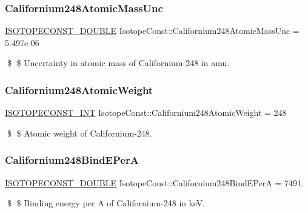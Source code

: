 \subsubsection{\texorpdfstring{Californium248\+Atomic\+Mass\+Unc}{Californium248AtomicMassUnc}}
{\footnotesize\ttfamily \mbox{\hyperlink{group___isotope_const-_macros_ga8f45a7272ce02c0b4c65c44636ed719a}{I\+S\+O\+T\+O\+P\+E\+C\+O\+N\+S\+T\+\_\+\+D\+O\+U\+B\+LE}} Isotope\+Const\+::\+Californium248\+Atomic\+Mass\+Unc = 5.\+497e-\/06}

\$ \$ Uncertainty in atomic mass of Californium-\/248 in amu. \mbox{\label{group___isotope_const-_californium-_cf248_ga7088e1f286e7d652cea5d9141ddc1b3b}} 
\subsubsection{\texorpdfstring{Californium248\+Atomic\+Weight}{Californium248AtomicWeight}}
{\footnotesize\ttfamily \mbox{\hyperlink{group___isotope_const-_macros_ga5f18360b3e99483a35c32d789e62621c}{I\+S\+O\+T\+O\+P\+E\+C\+O\+N\+S\+T\+\_\+\+I\+NT}} Isotope\+Const\+::\+Californium248\+Atomic\+Weight = 248}

\$ \$ Atomic weight of Californium-\/248. \mbox{\label{group___isotope_const-_californium-_cf248_ga554d3d907fa7b3a19a3105beb87daeea}} 
\subsubsection{\texorpdfstring{Californium248\+Bind\+E\+PerA}{Californium248BindEPerA}}
{\footnotesize\ttfamily \mbox{\hyperlink{group___isotope_const-_macros_ga8f45a7272ce02c0b4c65c44636ed719a}{I\+S\+O\+T\+O\+P\+E\+C\+O\+N\+S\+T\+\_\+\+D\+O\+U\+B\+LE}} Isotope\+Const\+::\+Californium248\+Bind\+E\+PerA = 7491.}

\$ \$ Binding energy per A of Californium-\/248 in keV. \mbox{\label{group___isotope_const-_californium-_cf248_ga96aa984c64c61ab16b8028cf50a89f57}} 
